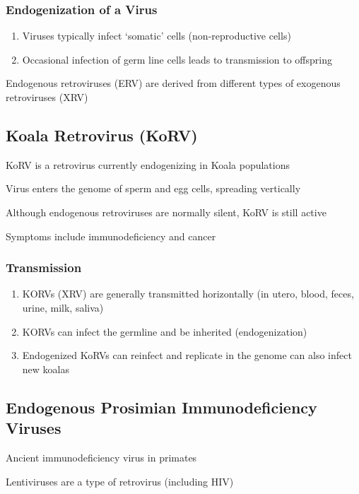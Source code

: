 \documentclass{notes}
\begin{document}
\subsubsection{Endogenization of a Virus}

\begin{enumerate}
    \item Viruses typically infect `somatic' cells (non-reproductive cells)
    \item Occasional infection of germ line cells leads to transmission to offspring
\end{enumerate}

Endogenous retroviruses (ERV) are derived from different types of exogenous retroviruses (XRV)

\subsection{Koala Retrovirus (KoRV)}

KoRV is a retrovirus currently endogenizing in Koala populations

Virus enters the genome of sperm and egg cells, spreading vertically

\tab Although endogenous retroviruses are normally silent, KoRV is still active

Symptoms include immunodeficiency and cancer

\subsubsection{Transmission}

\begin{enumerate}
    \item KORVs (XRV) are generally transmitted horizontally (in utero, blood, feces, urine, milk, saliva)
    \item KORVs can infect the germline and be inherited (endogenization)
    \item Endogenized KoRVs can reinfect and replicate in the genome
    \subitem can also infect new koalas
\end{enumerate}

\subsection{Endogenous Prosimian Immunodeficiency Viruses}

Ancient immunodeficiency virus in primates

Lentiviruses are a type of retrovirus (including HIV)
\end{document}
